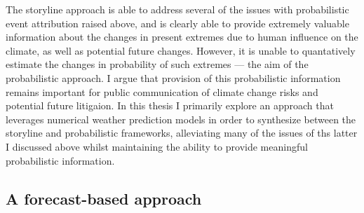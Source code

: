     The storyline approach is able to address several of the issues with probabilistic event attribution raised above, and is clearly able to provide extremely valuable information about the changes in present extremes due to human influence on the climate, as well as potential future changes. However, it is unable to quantatively estimate the changes in probability of such extremes --- the aim of the probabilistic approach. I argue that provision of this probabilistic information remains important for public communication of climate change risks and potential future litigaion. In this thesis I primarily explore an approach that leverages numerical weather prediction models in order to synthesize between the storyline and probabilistic frameworks, alleviating many of the issues of ths latter I discussed above whilst maintaining the ability to provide meaningful probabilistic information.

  \subsection{A forecast-based approach}

